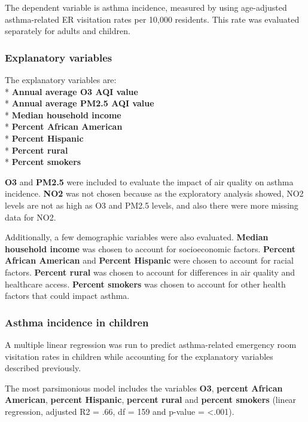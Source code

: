 \documentclass[12pt,]{article}
\begin{document}
The dependent variable is asthma incidence, measured by using
age-adjusted asthma-related ER visitation rates per 10,000 residents.
This rate was evaluated separately for adults and children.

\hypertarget{explanatory-variables}{%
\subsubsection{Explanatory variables}\label{explanatory-variables}}

The explanatory variables are:\\
* \textbf{Annual average O3 AQI value}\\
* \textbf{Annual average PM2.5 AQI value}\\
* \textbf{Median household income}\\
* \textbf{Percent African American}\\
* \textbf{Percent Hispanic}\\
* \textbf{Percent rural}\\
* \textbf{Percent smokers}

\textbf{O3} and \textbf{PM2.5} were included to evaluate the impact of
air quality on asthma incidence. \textbf{NO2} was not chosen because as
the exploratory analysis showed, NO2 levels are not as high as O3 and
PM2.5 levels, and also there were more missing data for NO2.

Additionally, a few demographic variables were also evaluated.
\textbf{Median household income} was chosen to account for socioeconomic
factors. \textbf{Percent African American} and \textbf{Percent Hispanic}
were chosen to account for racial factors. \textbf{Percent rural} was
chosen to account for differences in air quality and healthcare access.
\textbf{Percent smokers} was chosen to account for other health factors
that could impact asthma.

\newpage

\hypertarget{asthma-incidence-in-children}{%
\subsubsection{Asthma incidence in
children}\label{asthma-incidence-in-children}}

A multiple linear regression was run to predict asthma-related emergency
room visitation rates in children while accounting for the explanatory
variables described previously.

The most parsimonious model includes the variables \textbf{O3},
\textbf{percent African American}, \textbf{percent Hispanic},
\textbf{percent rural} and \textbf{percent smokers} (linear regression,
adjusted R2 = .66, df = 159 and p-value = \textless{}.001).
\end{document}
